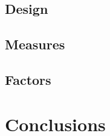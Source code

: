 \documentclass{DIKU-report}
\begin{document}
\subsection*{Design}
\subsection*{Measures}
\subsection*{Factors}
\vspace*{\fill}
\newpage
\addvspace{\bigskipamount}
\section*{Conclusions}

%


\end{document}
